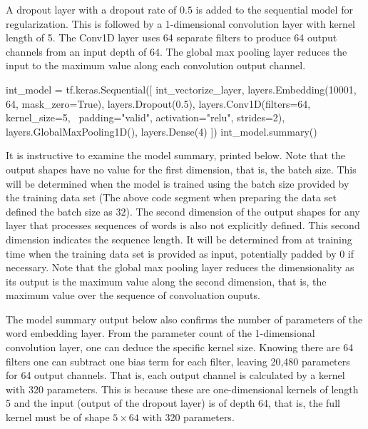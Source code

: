 A dropout layer with a dropout rate of $0.5$ is added to the sequential model for regularization. This is followed by a 1-dimensional convolution layer with kernel length of 5. The Conv1D layer uses 64 separate filters to produce 64 output channels from an input depth of 64. The global max pooling layer reduces the input to the maximum value along each convolution output channel.

\begin{samepage}
\begin{pythoncode}
int_model = tf.keras.Sequential([
  int_vectorize_layer, 
  layers.Embedding(10001, 64, mask_zero=True),
  layers.Dropout(0.5),
  layers.Conv1D(filters=64, kernel_size=5, \
      padding="valid", activation="relu", strides=2),
  layers.GlobalMaxPooling1D(),
  layers.Dense(4)
  ])
int_model.summary()
\end{pythoncode}
\end{samepage}

It is instructive to examine the model summary, printed below. Note that the output shapes have no value for the first dimension, that is, the batch size. This will be determined when the model is trained using the batch size provided by the training data set (The above code segment when preparing the data set defined the batch size as $32$). The second dimension of the output shapes for any layer that processes sequences of words is also not explicitly defined. This second dimension indicates the sequence length. It will be determined from at training time when the training data set is provided as input, potentially padded by $0$ if necessary. Note that the global max pooling layer reduces the dimensionality as its output is the maximum value along the second dimension, that is, the maximum value over the sequence of convoluation ouputs. 

The model summary output below also confirms the number of parameters of the word embedding layer. From the parameter count of the 1-dimensional convolution layer, one can deduce the specific kernel size. Knowing there are 64 filters one can subtract one bias term for each filter, leaving 20,480 parameters for 64 output channels. That is, each output channel is calculated by a kernel with 320 parameters. This is because these are one-dimensional kernels of length 5 and the input (output of the dropout layer) is of depth 64, that is, the full kernel must be of shape $5 \times 64$ with 320 parameters. 

